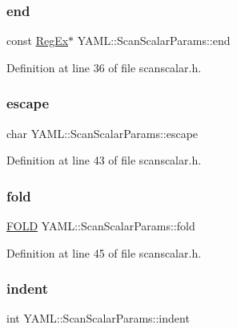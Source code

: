 \subsubsection{\texorpdfstring{end}{end}}
{\footnotesize\ttfamily const \mbox{\hyperlink{class_y_a_m_l_1_1_reg_ex}{Reg\+Ex}}$\ast$ Y\+A\+M\+L\+::\+Scan\+Scalar\+Params\+::end}



Definition at line 36 of file scanscalar.\+h.

\mbox{\label{struct_y_a_m_l_1_1_scan_scalar_params_aebdfc73fd5936c75cb19c7d7116857ac}} 
\subsubsection{\texorpdfstring{escape}{escape}}
{\footnotesize\ttfamily char Y\+A\+M\+L\+::\+Scan\+Scalar\+Params\+::escape}



Definition at line 43 of file scanscalar.\+h.

\mbox{\label{struct_y_a_m_l_1_1_scan_scalar_params_a708a9b04a78a52165a89f42559554dba}} 
\subsubsection{\texorpdfstring{fold}{fold}}
{\footnotesize\ttfamily \mbox{\hyperlink{namespace_y_a_m_l_a3660a77a9a6a5d6e4286899fb2ea5745}{F\+O\+LD}} Y\+A\+M\+L\+::\+Scan\+Scalar\+Params\+::fold}



Definition at line 45 of file scanscalar.\+h.

\mbox{\label{struct_y_a_m_l_1_1_scan_scalar_params_a3167ea3f80a79b765ade4de111c1ed2b}} 
\subsubsection{\texorpdfstring{indent}{indent}}
{\footnotesize\ttfamily int Y\+A\+M\+L\+::\+Scan\+Scalar\+Params\+::indent}




